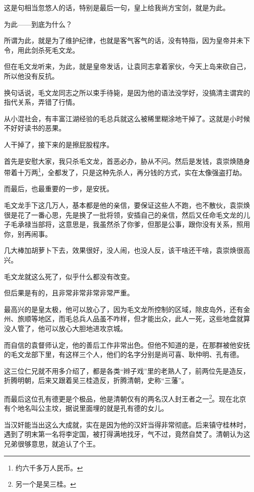 \begin{multicols}{\theparacolNo}
		这是句相当忽悠人的话，特别是最后一句，皇上给我尚方宝剑，就是为此。

		为此——到底为什么？

		所谓为此，就是为了维护纪律，也就是客气客气的话，没有特指，因为皇帝并未下令，用此剑杀死毛文龙。

		但在毛文龙听来，为此，就是皇帝发话，让袁同志拿着家伙，今天上岛来砍自己，所以他没有反抗。

		换句话说，毛文龙同志之所以束手待毙，是因为他的语法没学好，没搞清主谓宾的指代关系，弄错了行情。

		从小混社会，有丰富江湖经验的毛总兵就这么被稀里糊涂地干掉了。这就是小时候不好好读书的恶果。

		人干掉了，接下来的是擦屁股程序。

		首先是安慰大家，我只杀毛文龙，首恶必办，胁从不问。然后是发钱，袁崇焕随身带着十万两\footnote{约六千多万人民币。}，全都发了，只是这种先杀人，再分钱的方式，实在太像强盗打劫。

		而最后，也最重要的一步，是安抚。

		毛文龙手下这几万人，基本都是他的亲信，要保证这些人不跑，也不散伙，袁崇焕很是花了一番心思，先是换了一批将领，安插自己的亲信，然后又任命毛文龙的儿子毛承禄当部将，这意思是，我虽然杀了你爹，但那是公事，跟你没有关系，照用你，别再闹事。

		几大棒加胡萝卜下去，效果很好，没人闹，也没人反，该干啥还干啥，袁崇焕很高兴。

		毛文龙就这么死了，似乎什么都没有改变。

		但后果是有的，且非常非常非常非常严重。

		最高兴的是皇太极，他可以放心了，因为毛文龙所控制的区域，除皮岛外，还有金州、旅顺等地区，而毛总兵人品虽不咋样，但才能出众，此人一死，这些地盘就算没人管了，他可以放心大胆地进攻京城。

		而自信的袁督师认定，他的善后工作非常出色。但他不知道的是，在那群被他安抚的毛文龙部下里，有这样三个人，他们的名字分别是尚可喜、耿仲明、孔有德。

		这三位仁兄就不用多介绍了，都是各类“辫子戏”里的老熟人了，前两位先是造反，折腾明朝，后来又跟着吴三桂造反，折腾清朝，史称“三藩”。

		而最后这位孔有德更是个极品，他是清朝仅有的两名汉人封王者之一\footnote{另一个是吴三桂。}。现在北京有个地名叫公主坟，据说里面埋的就是孔有德的女儿。

		当汉奸能当出这么大成就，实在是因为他的汉奸当得非常彻底。后来镇守桂林时，遇到了明末第一名将李定国，被打得满地找牙，气不过，竟然自焚了。清朝认为这兄弟很够意思，就追认了个王。


\end{multicols}
